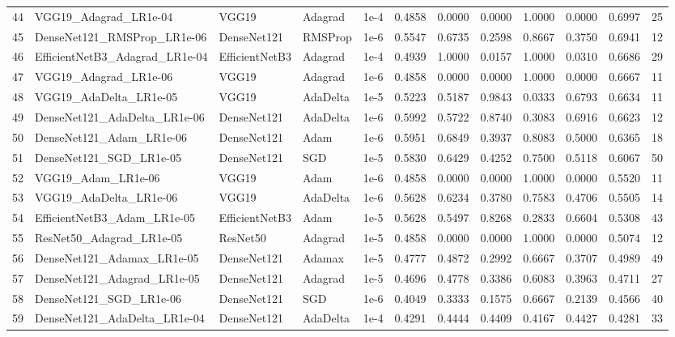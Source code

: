 \begin{longtable}{r l l l r r r r r r r r}
   44 & VGG19\_Adagrad\_LR1e-04   & VGG19 & Adagrad & 1e-4 & 0.4858 & 0.0000 & 0.0000 & 1.0000 & 0.0000 & 0.6997 & 25 \\
   45 & DenseNet121\_RMSProp\_LR1e-06 & DenseNet121 & RMSProp & 1e-6 & 0.5547 & 0.6735 & 0.2598 & 0.8667 & 0.3750 & 0.6941 & 12 \\
   46 & EfficientNetB3\_Adagrad\_LR1e-04 & EfficientNetB3 & Adagrad & 1e-4 & 0.4939 & 1.0000 & 0.0157 & 1.0000 & 0.0310 & 0.6686 & 29 \\
   47 & VGG19\_Adagrad\_LR1e-06   & VGG19 & Adagrad & 1e-6 & 0.4858 & 0.0000 & 0.0000 & 1.0000 & 0.0000 & 0.6667 & 11 \\
   48 & VGG19\_AdaDelta\_LR1e-05  & VGG19 & AdaDelta & 1e-5 & 0.5223 & 0.5187 & 0.9843 & 0.0333 & 0.6793 & 0.6634 & 11 \\
   49 & DenseNet121\_AdaDelta\_LR1e-06 & DenseNet121 & AdaDelta & 1e-6 & 0.5992 & 0.5722 & 0.8740 & 0.3083 & 0.6916 & 0.6623 & 12 \\
   50 & DenseNet121\_Adam\_LR1e-06 & DenseNet121 & Adam & 1e-6 & 0.5951 & 0.6849 & 0.3937 & 0.8083 & 0.5000 & 0.6365 & 18 \\
   51 & DenseNet121\_SGD\_LR1e-05 & DenseNet121 & SGD & 1e-5 & 0.5830 & 0.6429 & 0.4252 & 0.7500 & 0.5118 & 0.6067 & 50 \\
   52 & VGG19\_Adam\_LR1e-06      & VGG19 & Adam & 1e-6 & 0.4858 & 0.0000 & 0.0000 & 1.0000 & 0.0000 & 0.5520 & 11 \\
   53 & VGG19\_AdaDelta\_LR1e-06  & VGG19 & AdaDelta & 1e-6 & 0.5628 & 0.6234 & 0.3780 & 0.7583 & 0.4706 & 0.5505 & 14 \\
   54 & EfficientNetB3\_Adam\_LR1e-05 & EfficientNetB3 & Adam & 1e-5 & 0.5628 & 0.5497 & 0.8268 & 0.2833 & 0.6604 & 0.5308 & 43 \\
   55 & ResNet50\_Adagrad\_LR1e-05 & ResNet50 & Adagrad & 1e-5 & 0.4858 & 0.0000 & 0.0000 & 1.0000 & 0.0000 & 0.5074 & 12 \\
   56 & DenseNet121\_Adamax\_LR1e-05 & DenseNet121 & Adamax & 1e-5 & 0.4777 & 0.4872 & 0.2992 & 0.6667 & 0.3707 & 0.4989 & 49 \\
   57 & DenseNet121\_Adagrad\_LR1e-05 & DenseNet121 & Adagrad & 1e-5 & 0.4696 & 0.4778 & 0.3386 & 0.6083 & 0.3963 & 0.4711 & 27 \\
   58 & DenseNet121\_SGD\_LR1e-06 & DenseNet121 & SGD & 1e-6 & 0.4049 & 0.3333 & 0.1575 & 0.6667 & 0.2139 & 0.4566 & 40 \\
   59 & DenseNet121\_AdaDelta\_LR1e-04 & DenseNet121 & AdaDelta & 1e-4 & 0.4291 & 0.4444 & 0.4409 & 0.4167 & 0.4427 & 0.4281 & 33 \\

\end{longtable}
